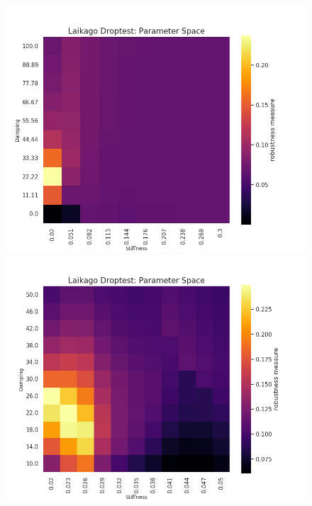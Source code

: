     \begin{figure}[h]
        \centering
        \begin{minipage}{0.33\textwidth}
            \centering
            \includegraphics[width=\textwidth]{figures/droptest_ps_full_correct.png} %
        \end{minipage}%
        \begin{minipage}{0.33\textwidth}
            \centering
            \includegraphics[width=\textwidth]{figures/droptest_ps_zoom1_correct.png} %

\end{minipage}
\end{figure}
